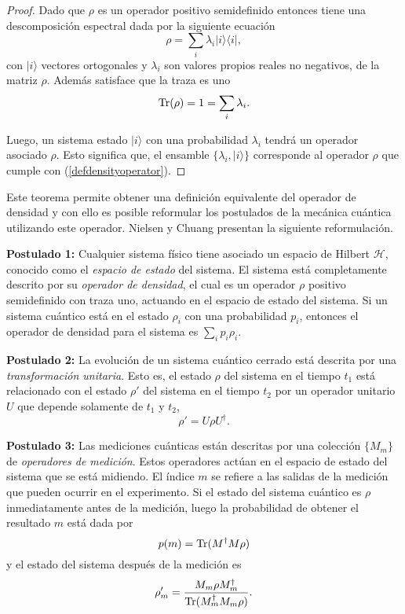 \begin{proof}
Dado que $\rho$ es un operador positivo semidefinido entonces tiene una descomposición espectral dada por la siguiente ecuación {\cite{nielsen_chuang_2010}} \[\rho=\sum_i \lambda_i |i\rangle \langle i|,\] con $|i\rangle$ vectores ortogonales y $\lambda_i$ son valores propios reales no negativos, de la matriz $\rho$. Además satisface que la traza es uno 
\[{\rm Tr}(\rho)=1=\sum_i\lambda_i.\]

Luego, un sistema estado $|i\rangle$ con una probabilidad $\lambda_i$ tendrá un
operador asociado $\rho$. Esto significa que, el ensamble $\{\lambda_i,
|i\rangle\}$  corresponde al operador $\rho$ que cumple con
({\ref{defdensityoperator}}).


\end{proof}



Este teorema  permite obtener una definición equivalente del operador de densidad y con ello es posible reformular los postulados de la mecánica cuántica utilizando este operador. Nielsen y Chuang {\cite{nielsen_chuang_2010}} presentan la siguiente reformulación.


\setlength{\leftskip}{1cm}

 \textbf{Postulado 1:} Cualquier sistema físico tiene asociado un espacio de Hilbert $\mathcal{H}$, conocido como el \textit{espacio de estado} del sistema. El sistema está completamente descrito por su \textit{operador de densidad}, el cual es un operador $\rho$ positivo semidefinido con traza uno, actuando en el espacio de estado del sistema. Si un sistema cuántico está en el estado $\rho_i$ con una probabilidad $p_i$, entonces el operador de densidad para el sistema es $\sum_{i}p_i\rho_i$.


\textbf{Postulado 2:} La evolución de un sistema cuántico cerrado está descrita por una \textit{transformación unitaria}. Esto es, el estado $\rho$ del sistema en el tiempo $t_1$ está relacionado con el estado $\rho'$ del sistema en el tiempo $t_2$ por un operador unitario $U$ que depende solamente de $t_1$ y $t_2$, \begin{equation}\label{postulado 2}
\rho'=U\rho U^{\dagger}.
\end{equation}


\textbf{Postulado 3:} Las mediciones cuánticas están descritas por una
colección $\{M_m\}$ de \textit{operadores de medición}. Estos operadores actúan
en el espacio de estado del sistema que se está midiendo. El índice $m$ se
refiere a las salidas de la medición que pueden ocurrir en el experimento. Si
el estado del sistema cuántico es $\rho$ inmediatamente antes de la medición,
luego la probabilidad de obtener el resultado $m$ está dada por
\begin{equation}\label{probaility3postulate}
	p(m)={\rm Tr}(M^\dagger M \rho)
\end{equation} y el estado del sistema después de la medición es  \begin{equation}\label{state3postulate}
	\rho_m'=\dfrac{M_m\rho M_m^\dagger}{{\rm Tr}(M_m^\dagger M_m \rho)}.
\end{equation}

